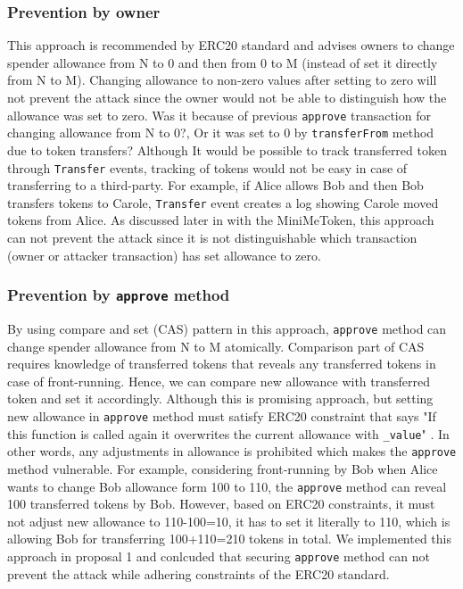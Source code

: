 \subsubsection*{Prevention by owner} This approach is recommended by ERC20 standard \cite{Ref08} and advises owners to change spender allowance from N to 0 and then from 0 to M (instead of set it directly from N to M). Changing allowance to non-zero values after setting to zero will not prevent the attack since the owner would not be able to distinguish how the allowance was set to zero. Was it because of previous \texttt{approve} transaction for changing allowance from N to 0?, Or it was set to 0 by \texttt{transferFrom} method due to token transfers? Although It would be possible to track transferred token through \texttt{Transfer} events, tracking of tokens would not be easy in case of transferring to a third-party. For example, if Alice allows Bob and then Bob transfers tokens to Carole, \texttt{Transfer} event creates a log showing Carole moved tokens from Alice. As discussed later in with the \textsf{MiniMeToken}, this approach can not prevent the attack since it is not distinguishable which transaction (\ie owner or attacker transaction) has set allowance to zero.
	
\subsubsection*{Prevention by \texttt{approve} method} By using compare and set (CAS) pattern \cite{Ref06} in this approach, \texttt{approve} method can change spender allowance from N to M atomically. Comparison part of CAS requires knowledge of transferred tokens that reveals any transferred tokens in case of front-running. Hence, we can compare new allowance with transferred token and set it accordingly. Although this is promising approach, but setting new allowance in \texttt{approve} method must satisfy ERC20 constraint that says "If this function is called again it overwrites the current allowance with \texttt{\_value}" \cite{Ref08}. In other words, any adjustments in allowance is prohibited which makes the \texttt{approve} method vulnerable. For example, considering front-running by Bob when Alice wants to change Bob allowance form 100 to 110, the \texttt{approve} method can reveal 100 transferred tokens by Bob. However, based on ERC20 constraints, it must not adjust new allowance to 110-100=10, it has to set it literally to 110, which is allowing Bob for transferring 100+110=210 tokens in total. We implemented this approach in proposal 1 and conlcuded that securing \texttt{approve} method can not prevent the attack while adhering constraints of the ERC20 standard.
	
